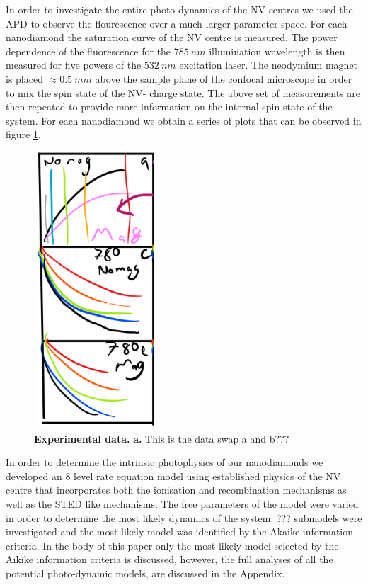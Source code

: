 \documentclass[,prl,twocolumn]{revtex4}
\begin{document}
In order to investigate the entire photo-dynamics of the NV centres we used the APD to observe the flourescence over a much larger parameter space. For each nanodiamond the saturation curve of the NV centre is measured. The power dependence of the fluorescence for the $\SI{785}{nm}$ illumination wavelength is then measured for five powers of the $\SI{532}{nm}$ excitation laser. The neodymium magnet is placed $\approx \SI{0.5}{mm}$ above the sample plane of the confocal microscope in order to mix the spin state of the NV- charge state. The above set of measurements are then repeated to provide more information on the internal spin state of the system. For each nanodiamond we obtain a series of plots that can be observed in figure \ref{FigData}.

\begin{figure}[H]
  \centering
  \includegraphics[width=0.4\textwidth]{Data2.png} 
 \caption{\textbf{Experimental data.} \textbf{a.} This is the data swap a and b???} \label{FigData}
\end{figure}


In order to determine the intrinsic photophysics of our nanodiamonds we developed an 8 level rate equation model using established physics of the NV centre that incorporates both the ionisation and recombination mechanisms as well as the STED like mechanisms. The free parameters of the model were varied in order to determine the most likely dynamics of the system. ??? submodels were investigated and the most likely model was identified by the Akaike information criteria. In the body of this paper only the most likely model selected by the Aikike information criteria is discussed, however, the full analyses of all the potential photo-dynamic models, are discussed in the Appendix. 
\end{document}
